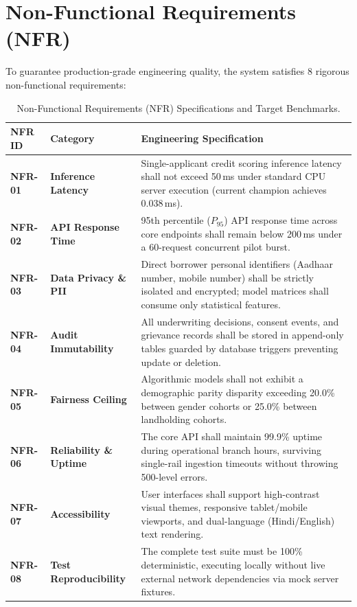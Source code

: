 \documentclass[11pt,a4paper,oneside]{report}
\begin{document}
\section{Non-Functional Requirements (NFR)}
To guarantee production-grade engineering quality, the system satisfies 8 rigorous non-functional requirements:

\begin{table}[H]
\centering
\small
\renewcommand{\arraystretch}{1.2}
\begin{tabularx}{\textwidth}{l p{3.2cm} X}
  \toprule
  \textbf{NFR ID} & \textbf{Category} & \textbf{Engineering Specification} \\
  \midrule
  \textbf{NFR-01} & \textbf{Inference Latency} & Single-applicant credit scoring inference latency shall not exceed 50\,ms under standard CPU server execution (current champion achieves 0.038\,ms). \\
  \addlinespace
  \textbf{NFR-02} & \textbf{API Response Time} & 95th percentile ($P_{95}$) API response time across core endpoints shall remain below 200\,ms under a 60-request concurrent pilot burst. \\
  \addlinespace
  \textbf{NFR-03} & \textbf{Data Privacy \& PII} & Direct borrower personal identifiers (Aadhaar number, mobile number) shall be strictly isolated and encrypted; model matrices shall consume only statistical features. \\
  \addlinespace
  \textbf{NFR-04} & \textbf{Audit Immutability} & All underwriting decisions, consent events, and grievance records shall be stored in append-only tables guarded by database triggers preventing update or deletion. \\
  \addlinespace
  \textbf{NFR-05} & \textbf{Fairness Ceiling} & Algorithmic models shall not exhibit a demographic parity disparity exceeding 20.0\% between gender cohorts or 25.0\% between landholding cohorts. \\
  \addlinespace
  \textbf{NFR-06} & \textbf{Reliability \& Uptime} & The core API shall maintain 99.9\% uptime during operational branch hours, surviving single-rail ingestion timeouts without throwing 500-level errors. \\
  \addlinespace
  \textbf{NFR-07} & \textbf{Accessibility} & User interfaces shall support high-contrast visual themes, responsive tablet/mobile viewports, and dual-language (Hindi/English) text rendering. \\
  \addlinespace
  \textbf{NFR-08} & \textbf{Test Reproducibility} & The complete test suite must be 100\% deterministic, executing locally without live external network dependencies via mock server fixtures. \\
  \bottomrule
\end{tabularx}
\caption{Non-Functional Requirements (NFR) Specifications and Target Benchmarks.}
\label{tab:nfr_table}
\end{table}
\end{document}
